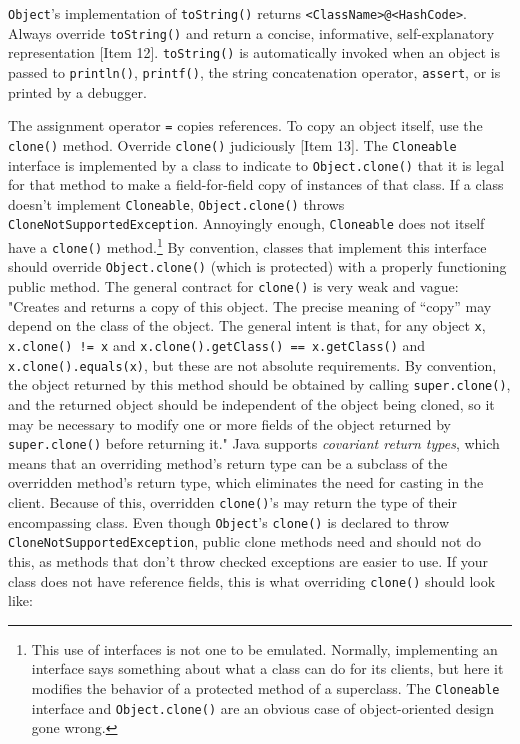 \documentclass[table, xcdraw]{article}%
\begin{document}
\texttt{Object}'s implementation of \texttt{toString()} returns \texttt{<ClassName>@<HashCode>}. Always override \texttt{toString()} and return a concise, informative, self-explanatory representation [Item 12]. \texttt{toString()} is automatically invoked when an object is passed to \texttt{println()}, \texttt{printf()}, the string concatenation operator, \texttt{assert}, or is printed by a debugger.

The assignment operator \texttt{=} copies references. To copy an object itself, use the \texttt{clone()} method. Override \texttt{clone()} judiciously [Item 13]. The \texttt{Cloneable} interface is implemented by a class to indicate to \texttt{Object.clone()} that it is legal for that method to make a field-for-field copy of instances of that class. If a class doesn't implement \texttt{Cloneable}, \texttt{Object.clone()} throws \texttt{CloneNotSupportedException}. Annoyingly enough, \texttt{Cloneable} does not itself have a \texttt{clone()} method.\footnote{This use of interfaces is not one to be emulated. Normally, implementing an interface says something about what a class can do for its clients, but here it modifies the behavior of a protected method of a superclass. The \texttt{Cloneable} interface and \texttt{Object.clone()} are an obvious case of object-oriented design gone wrong.} By convention, classes that implement this interface should override \texttt{Object.clone()} (which is protected) with a properly functioning public method. The general contract for \texttt{clone()} is very weak and vague: "Creates and returns a copy of this object. The precise meaning of “copy” may depend on the class of the object. The general intent is that, for any object \texttt{x}, \texttt{x.clone() != x} and \texttt{x.clone().getClass() == x.getClass()} and \texttt{x.clone().equals(x)}, but these are not absolute requirements. By convention, the object returned by this method should be obtained by calling \texttt{super.clone()}, and the returned object should be independent of the object being cloned, so it may be necessary to modify one or more fields of the object returned by \texttt{super.clone()} before returning it." Java supports \emph{covariant return types}, which means that an overriding method's return type can be a subclass of the overridden method's return type, which eliminates the need for casting in the client. Because of this, overridden \texttt{clone()}'s may return the type of their encompassing class. Even though \texttt{Object}'s \texttt{clone()} is declared to throw \texttt{CloneNotSupportedException}, public clone methods need and should not do this, as methods that don't throw checked exceptions are easier to use. If your class does not have reference fields, this is what overriding \texttt{clone()} should look like:
\end{document}
